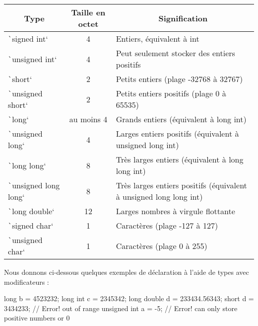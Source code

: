 \documentclass[10pt]{article}
\begin{document}
\begin{table}[H]
    \centering
    \begin{tabular}{|l|c|l|}
    \hline
    \multicolumn{1}{|c|}{\textbf{Type}} & \textbf{Taille en octet} & \multicolumn{1}{c|}{\textbf{Signification}}                                        \\ \hline
    \texttt`signed int`                            & 4              & Entiers, équivalent à int\\ \hline
    \texttt`unsigned int`                          & 4              & Peut seulement stocker des entiers positifs\\ \hline
    \texttt`short`                                 & 2              & Petits entiers (plage -32768 à 32767)\\ \hline
    \texttt`unsigned short`                        & 2              & Petits entiers positifs (plage 0 à 65535)\\ \hline
    \texttt`long`                                  & au moins 4     & Grands entiers (équivalent à long int)\\ \hline
    \texttt`unsigned long`                         & 4              & Larges entiers positifs (équivalent à unsigned long int)\\ \hline
    \texttt`long long`                             & 8              & Très larges entiers (équivalent à long long int)\\ \hline
    \texttt`unsigned long long`                    & 8              & Très larges entiers positifs (équivalent à unsigned long long int)\\ \hline
    \texttt`long double`                           & 12             & Larges nombres à virgule flottante\\ \hline
    \texttt`signed char`                           & 1              & Caractères (plage -127 à 127) \\ \hline
    \texttt`unsigned char`                         & 1              & Caractères (plage 0 à 255)\\ \hline
    \end{tabular}
\end{table}

Nous donnons ci-dessous quelques exemples de déclaration à l'aide de types avec modificateurs :

\begin{cppcode}
    long b = 4523232;
    long int c = 2345342;
    long double d = 233434.56343;
    short d = 3434233; // Error! out of range
    unsigned int a = -5;    // Error! can only store positive numbers or 0
\end{cppcode}
\end{document}
